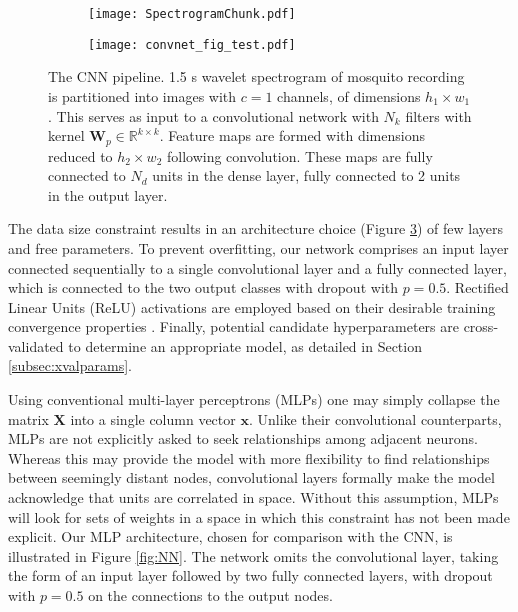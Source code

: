\documentclass[10pt, twocolumn]{llncs}
\begin{document}
\begin{figure}[t]
\centering
 \begin{subfigure}[]{.2\columnwidth}
    \texttt{[image: SpectrogramChunk.pdf]}
    \label{fig:subfig:convspec}
  \end{subfigure}%
  \begin{subfigure}[]{.8\columnwidth}
    \texttt{[image: convnet\_fig\_test.pdf]}
  \label{fig:subfig:convdiagram}
   \end{subfigure}

\caption{The CNN pipeline. 1.5 s wavelet spectrogram of mosquito recording is partitioned into images with $c=1$ channels, of dimensions $h_1 \times w_1$. This serves as input to a convolutional network with $N_k$  filters with kernel $\mathbf{W}_p \in \mathbb{R}^{k\times k}$.  Feature maps are formed with dimensions reduced to $h_2 \times w_2$ following convolution. These maps are fully connected to $N_d$ units in the dense layer, fully connected to 2 units in the output layer.}
\label{fig:CNN}
\end{figure}

The data size constraint results in an architecture choice (Figure \ref{fig:CNN}) of few layers and free parameters. To prevent overfitting, our network comprises an input layer connected sequentially to a single convolutional layer and a fully connected layer, which is connected to the two output classes with dropout \cite{srivastava2014dropout} with $p=0.5$. Rectified Linear Units (ReLU) activations are employed based on their desirable training convergence properties \cite{krizhevsky2012imagenet}. Finally, potential candidate hyperparameters are cross-validated to determine an appropriate model, as detailed in Section \ref{subsec:xvalparams}.

Using conventional multi-layer perceptrons (MLPs) one may simply collapse the matrix $\mathbf{X}$ into a single column vector $\mathbf{x}$. Unlike their convolutional counterparts, MLPs are not explicitly asked to seek relationships among adjacent neurons. Whereas this may provide the model with more flexibility to find relationships between seemingly distant nodes, convolutional layers formally make the model acknowledge that units are correlated in space. Without this assumption, MLPs will look for sets of weights in a space in which this constraint has not been made explicit. Our MLP architecture, chosen for comparison with the CNN, is illustrated in Figure \ref{fig:NN}. The network omits the convolutional layer, taking the form of an input layer followed by two fully connected layers, with dropout with $p=0.5$ on the connections to the output nodes.
\end{document}
